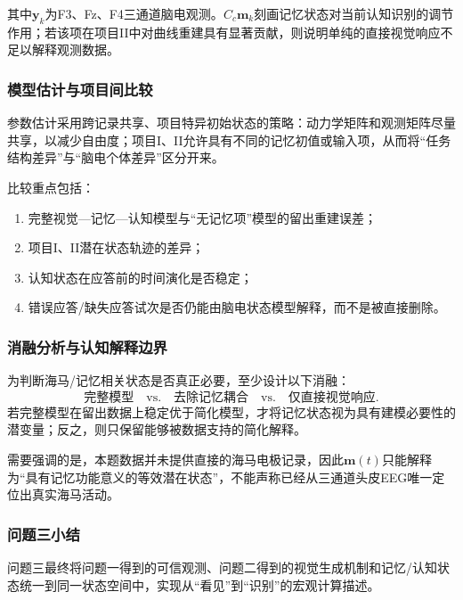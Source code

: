 其中$\bm y_k$为F3、Fz、F4三通道脑电观测。$C_c\bm m_k$刻画记忆状态对当前认知识别的调节作用；若该项在项目II中对曲线重建具有显著贡献，则说明单纯的直接视觉响应不足以解释观测数据。


\subsubsection{模型估计与项目间比较}

参数估计采用跨记录共享、项目特异初始状态的策略：动力学矩阵和观测矩阵尽量共享，以减少自由度；项目I、II允许具有不同的记忆初值或输入项，从而将“任务结构差异”与“脑电个体差异”区分开来。

比较重点包括：
\begin{enumerate}[label=(\arabic*)]
    \item 完整视觉—记忆—认知模型与“无记忆项”模型的留出重建误差；
    \item 项目I、II潜在状态轨迹的差异；
    \item 认知状态在应答前的时间演化是否稳定；
    \item 错误应答/缺失应答试次是否仍能由脑电状态模型解释，而不是被直接删除。
\end{enumerate}

\subsubsection{消融分析与认知解释边界}

为判断海马/记忆相关状态是否真正必要，至少设计以下消融：
\[
\text{完整模型}
\quad\text{vs.}\quad
\text{去除记忆耦合}
\quad\text{vs.}\quad
\text{仅直接视觉响应}.
\]
若完整模型在留出数据上稳定优于简化模型，才将记忆状态视为具有建模必要性的潜变量；反之，则只保留能够被数据支持的简化解释。

需要强调的是，本题数据并未提供直接的海马电极记录，因此$\bm m(t)$只能解释为“具有记忆功能意义的等效潜在状态”，不能声称已经从三通道头皮EEG唯一定位出真实海马活动。

\subsubsection{问题三小结}

问题三最终将问题一得到的可信观测、问题二得到的视觉生成机制和记忆/认知状态统一到同一状态空间中，实现从“看见”到“识别”的宏观计算描述。
